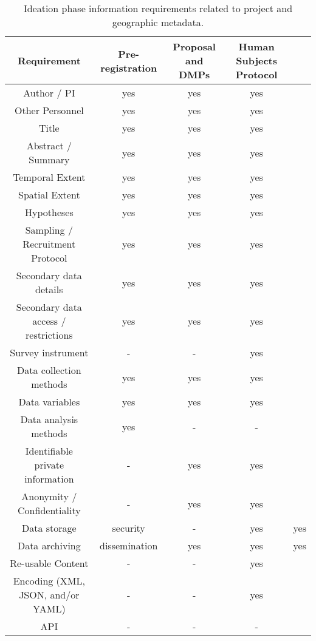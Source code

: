 \documentclass{isprs} %
\begin{document}
\begin{table*}[h]
	\centering
		\begin{tabular}{|c|c|c|c|}\hline
		   Requirement&Pre-registration&Proposal and DMPs&Human Subjects Protocol\\\hline
		     Author / PI                            & yes & yes & yes \\
		     Other Personnel                        & yes & yes & yes \\
    		 Title                                  & yes & yes & yes \\
    		 Abstract / Summary                     & yes & yes & yes \\
    		 Temporal Extent                        & yes & yes & yes \\
    		 Spatial Extent                         & yes & yes & yes \\
    		 Hypotheses                             & yes & yes & yes \\
    		 Sampling / Recruitment Protocol        & yes & yes & yes \\
    		 Secondary data details                 & yes & yes & yes \\
    		 Secondary data access / restrictions   & yes & yes & yes \\
    		 Survey instrument                      & - & - & yes \\
    		 Data collection methods                & yes & yes & yes \\
    		 Data variables                         & yes & yes & yes \\
    		 Data analysis methods                  & yes & - & - \\
    		 Identifiable private information       & - & yes & yes \\
    		 Anonymity / Confidentiality            & - & yes & yes \\
    		 Data storage & security                & - & yes & yes \\
    		 Data archiving & dissemination         & yes & yes & yes \\
     		 Re-usable Content                      & - & - & yes \\
    		 Encoding (XML, JSON, and/or YAML)      & - & - & yes \\
    		 API                                    & - & - & - \\\hline
		\end{tabular}
	\caption{Ideation phase information requirements related to project and geographic metadata.}
\label{tab:Ideation_Info}
\end{table*}
\end{document}
